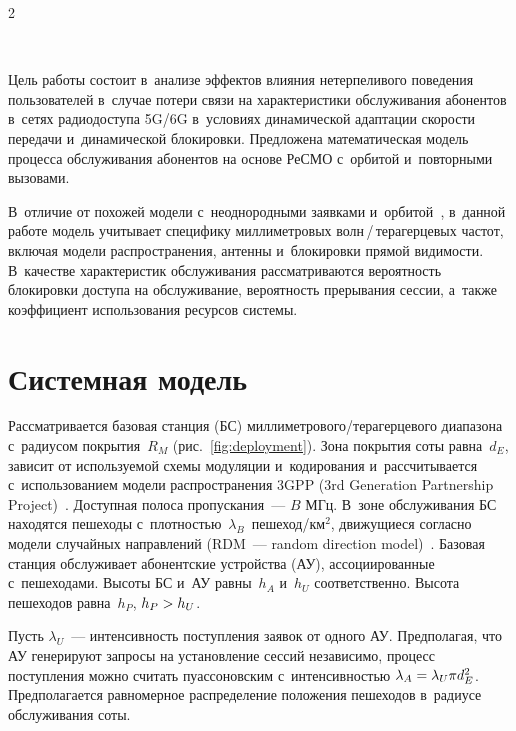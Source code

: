 \begin{multicols}{2}
\begin{figure*}[b] %
 \vspace*{1pt}
\begin{center}
   \mbox{%
\epsfxsize=163mm 
}
\end{center}
\vspace*{-9pt}
\label{fig:deployment}
\end{figure*}

Цель работы состоит в~анализе эффектов влияния нетерпеливого поведения 
пользователей в~случае потери связи на характеристики обслуживания абонентов 
в~сетях радиодоступа 5G/6G в~условиях динамической адап\-та\-ции ско\-рости передачи 
и~динамической блокировки. Предложена математическая модель процесса обслуживания 
абонентов на основе РеСМО с~орбитой 
и~по\-втор\-ны\-ми вызовами. 

В~отличие от похожей модели с~неоднородными заявками 
и~орбитой~\cite{vlaskina2022}, в~данной работе модель учитывает специфику 
мил\-ли\-мет\-ро\-вых волн\,/\,те\-ра\-гер\-це\-вых час\-тот, вклю\-чая модели распространения,
 антенны и~блокировки пря\-мой ви\-ди\-мости. В~качестве характеристик обслуживания 
рассматриваются ве\-ро\-ят\-ность блокировки до\-сту\-па на обслуживание, ве\-ро\-ят\-ность 
прерывания сессии, а~так\-же коэффициент использования ресурсов сис\-темы.

\section{Системная модель}


Рассматривается базовая станция (БС) мил\-ли\-мет\-ро\-во\-го/те\-ра\-гер\-це\-во\-го диапазона 
с~радиусом по\-кры\-тия~$R_M$ (рис.~\ref{fig:deployment}). Зона покрытия соты рав\-на~$d_E$, 
зависит от ис\-поль\-зу\-емой схемы модуляции и~кодирования и~рас\-счи\-ты\-ва\-ет\-ся 
с~использованием модели рас\-про\-стра\-не\-ния 3GPP (3rd Generation Partnership Project)~\cite{kovalchukov2019accurate}. 
До\-ступ\-ная полоса про\-пус\-ка\-ния~--- $B$ МГц. В~зоне обслуживания БС находятся 
пешеходы с~плот\-ностью~$\lambda_B$~пе\-ше\-ход/км$^2$, дви\-жу\-щи\-еся согласно модели 
случайных на\-прав\-ле\-ний (RDM~--- random direction model)~\cite{nain2005properties}. Базовая станция обслуживает 
абонентские устройства (АУ), ас\-со\-ци\-иро\-ван\-ные с~пешеходами. Высоты БС и~АУ равны~$h_A$ и~$h_U$ 
соответственно. Высота пешеходов рав\-на~$h_P$, $h_P\hm>h_U$.


Пусть $\lambda_{U}$~--- интенсивность по\-ступ\-ле\-ния заявок от одного АУ. 
Предполагая, что АУ генерируют запросы на уста\-нов\-ле\-ние сессий независимо, 
процесс по\-ступ\-ле\-ния мож\-но считать пуассоновским с~ин\-тен\-сив\-ностью
$\lambda_A\hm=\lambda_{U}\pi{}d_{E}^2$. Пред\-по\-ла\-га\-ет\-ся рав\-но\-мер\-ное рас\-пре\-де\-ле\-ние 
положения пешеходов в~радиусе обслуживания \mbox{соты}.



\end{multicols}
